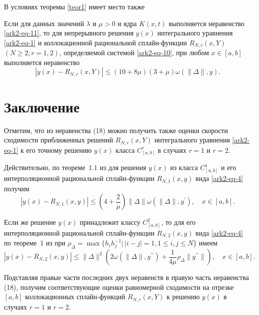 В условиях теоремы \ref{teor1} имеет место также

\begin{theorem}\label{teor2}
Если для данных значений $\lambda$ и $\mu>0$ и ядра $K(x,t)$ выполняется неравенство \eqref{ark2-eq-11},
то для непрерывного решения $y(x)$ интегрального уравнения \eqref{ark2-eq-1} и коллокационной
рациональной сплайн-функции $R_{N,r}(x,Y)$ $(N\geqslant 2; r=1,2)$, определяемой системой \eqref{ark2-eq-10},
при любом $x\in[a,b]$ выполняется неравенство
$$
|y(x)-R_{N,r}(x,Y)|\leqslant (10+8\mu)(3+\mu)\omega(\|\Delta\|,y).
$$
\end{theorem}

\section{Заключение}

 Отметим, что из неравенства (18) можно получить также оценки скорости сходимости
приближенных решений $R_{N,r}(x,Y)$ интегрального уравнения \eqref{ark2-eq-1} к его точному решению $y(x)$
класса $C^r_{[a,b]}$ в случаях $r=1$ и $r=2$.

Действительно, по теореме~1.1 из \cite{ark-10} для решения $y(x)$ из класса $C^1_{[a,b]}$ и
его интерполяционной рациональной сплайн-функции $R_{N,1}(x,y)$ вида \eqref{ark2-eq-4} получим
$$
|y(x)-R_{N,1}(x,y)|\leqslant
\left(4+\frac 2\mu\right)\|\Delta\|\omega(\|\Delta\|,y^\prime),\quad x\in[a,b].
$$

Если же решение $y(x)$ принадлежит классу $C^2_{[a,b]}$, то для
его интерполяционной рациональной сплайн-функции $R_{N,2}(x,y)$ вида \eqref{ark2-eq-4}
по теореме~1 из \cite{ark-11} при
$\rho_\Delta=\max\{h_ih_j^{-1}|\,|i-j|=1, 1\leqslant i,j\leqslant N\}$ имеем
$$
|y(x)-R_{N,2}(x,y)|\leqslant \|\Delta\|^2\left(2\omega(\|\Delta\|,y^{\prime\prime})+
\frac1{4\mu} \rho_\Delta \|y^{\prime\prime}\|\right),\quad x\in[a,b].
$$

Подставляя правые части последних двух неравенств в правую часть неравенства (18), получим
соответствующие оценки равномерной сходимости на отрезке $[a,b]$ коллокационных сплайн-функций
$R_{N,r} (x,Y)$ к решению $y(x)$ в случаях $r=1$ и $r=2$.




